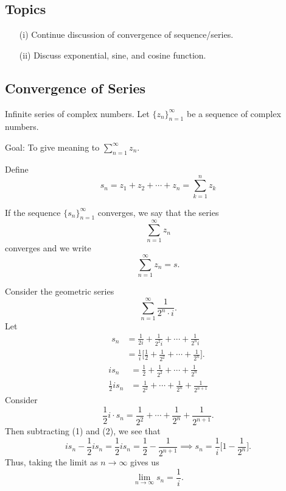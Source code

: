 \documentclass[a4paper]{report}
\begin{document}
\subsection{Topics}

\begin{enumerate}
    \item[(i)] Continue discussion of convergence of sequence/series.
    \item[(ii)] Discuss exponential, sine, and cosine function.
\end{enumerate}


\subsection{Convergence of Series}

Infinite series of complex numbers. Let \( \{ {z}_{n} \}_{n=1}^{\infty } \) be a sequence of complex numbers. 

Goal: To give meaning to \( \sum_{ n=1  }^{ \infty  } {z}_{n} \).

Define \[ {s}_{n} = {z}_{1} + {z}_{2} + \cdots + {z}_{n} = \sum_{ k = 1  }^{ n } {z}_{k} \] 
\begin{definition}
    If the sequence \( \{ {s}_{n} \}_{n=1}^{\infty } \) converges, we say that the series  
    \[  \sum_{ n=1  }^{ \infty  } {z}_{n} \]
    converges and we write
    \[  \sum_{ n = 1  }^{  \infty   } {z}_{n} = s. \]
\end{definition}

\begin{eg}
    Consider the geometric series
    \[  \sum_{ n=1  }^{ \infty  } \frac{ 1  }{ 2^{n} \cdot i  }. \]
    Let 
    \begin{align*}
    {s}_{n} &= \frac{ 1 }{ 2 i  }  + \frac{ 1 }{ 2^{2} i   } + \cdots + \frac{ 1  }{ 2^{n} i  }   \\
            &=  \frac{ 1 }{ i }  \Big[ \frac{ 1 }{ 2 }  + \frac{ 1 }{ 2^{2} }  + \cdots + \frac{ 1 }{ 2^{n} } \Big].
\end{align*}
\begin{align*}
    i {s}_{n} &= \frac{ 1 }{ 2 }  + \frac{ 1 }{ 2^{2}  } + \cdots + \frac{ 1 }{ 2^{n} } \tag{1}  \\
    \frac{ 1 }{ 2 }  i {s}_{n} &= \frac{ 1 }{ 2^{2}  }  + \cdots + \frac{ 1 }{ 2^{n}  } + \frac{ 1 }{ 2^{n+1} } \tag{2}
\end{align*}
Consider
\[  \frac{ 1 }{ 2 }  i \cdot {s}_{n} = \frac{ 1 }{ 2^{2}  }  + \cdots + \frac{ 1 }{ 2^{n} }  + \frac{ 1 }{  2^{n+1} }.  \]
Then subtracting (1) and (2), we see that
\[ i {s}_{n} - \frac{ 1 }{ 2 }  i {s}_{n} =   \frac{ 1 }{ 2 }  i {s}_{n} = \frac{ 1 }{ 2 }  - \frac{ 1 }{ 2^{n+1} } \implies {s}_{n} = \frac{ 1 }{ i }  \Big[ 1 - \frac{ 1 }{ 2^{n} } \Big].   \]
Thus, taking the limit as \( n \to \infty   \) gives us 
\[  \lim_{ n \to \infty  }  {s}_{n} = \frac{ 1 }{ i }. \]
\end{eg}
\end{document}

